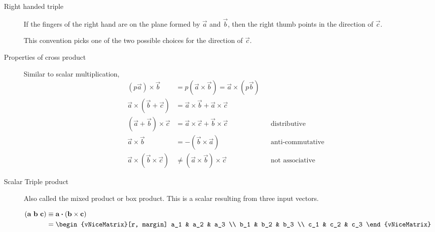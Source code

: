 \begin{description}
    \item[Right handed triple] If the fingers of the right hand are on the plane formed
        by $ \vec{a} $ and $ \vec{b} $, then the right thumb points in the direction of
        $ \vec{c} $. \par
        This convention picks one of the two possible choices for the direction of
        $ \vec{c} $.

    \item[Properties of cross product] Similar to scalar multiplication,
        \begin{align}
            (p\vec{a}) \times \vec{b}               & = p (\vec{a} \times \vec{b}) =
            \vec{a} \times (p\vec{b})                                                  \\
            \vec{a} \times (\vec{b} + \vec{c})      & = \vec{a} \times \vec{b}
            + \vec{a} \times \vec{c}                                                   \\
            (\vec{a} + \vec{b}) \times \vec{c}      & = \vec{a} \times \vec{c}
            + \vec{b} \times \vec{c}                &
                                                    & \text{distributive}              \\
            \vec{a} \times \vec{b}                  & = - (\vec{b} \times \vec{a})   &
                                                    & \text{anti-commutative}          \\
            \vec{a} \times (\vec{b} \times \vec{c}) & \neq
            (\vec{a} \times \vec{b}) \times \vec{c} &
                                                    & \text{not associative}
        \end{align}

    \item[Scalar Triple product] Also called the mixed product or box product. This
        is a scalar resulting from three input vectors. \par
        \begin{align}
            (\vec{a}\ \vec{b}\ \vec{c}) & \equiv \vec{a} \dotp
            (\vec{b} \times \vec{c})                                      \\
                                        & = \begin{vNiceMatrix}[r, margin]
                                                a_1 & a_2 & a_3 \\
                                                b_1 & b_2 & b_3 \\
                                                c_1 & c_2 & c_3
                                            \end{vNiceMatrix}
        \end{align}


\end{description}
